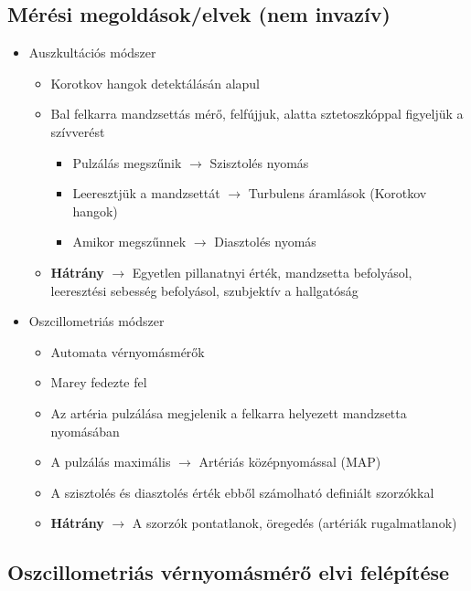 \subsection{Mérési megoldások/elvek (nem invazív)}
\begin{itemize}
    \item Auszkultációs módszer
    \begin{itemize}
        \item Korotkov hangok detektálásán alapul
        \item Bal felkarra mandzsettás mérő, felfújjuk, alatta sztetoszkóppal figyeljük a szívverést
        \begin{itemize}
            \item Pulzálás megszűnik $\rightarrow$ Szisztolés nyomás
            \item Leeresztjük a mandzsettát $\rightarrow$ Turbulens áramlások (Korotkov hangok)
            \item Amikor megszűnnek $\rightarrow$ Diasztolés nyomás
        \end{itemize}
        \item \textbf{Hátrány} $\rightarrow$ Egyetlen pillanatnyi érték, mandzsetta befolyásol, leeresztési sebesség befolyásol, szubjektív a hallgatóság
    \end{itemize}
    \item Oszcillometriás módszer
    \begin{itemize}
        \item Automata vérnyomásmérők
        \item Marey fedezte fel
        \item Az artéria pulzálása megjelenik a felkarra helyezett mandzsetta nyomásában
        \item A pulzálás maximális $\rightarrow$ Artériás középnyomással (MAP)
        \item A szisztolés és diasztolés érték ebből számolható definiált szorzókkal
        \item \textbf{Hátrány} $\rightarrow$ A szorzók pontatlanok, öregedés (artériák rugalmatlanok)
    \end{itemize}
\end{itemize}

\clearpage
\subsection{Oszcillometriás vérnyomásmérő elvi felépítése}
\begin{center}
\end{center}

